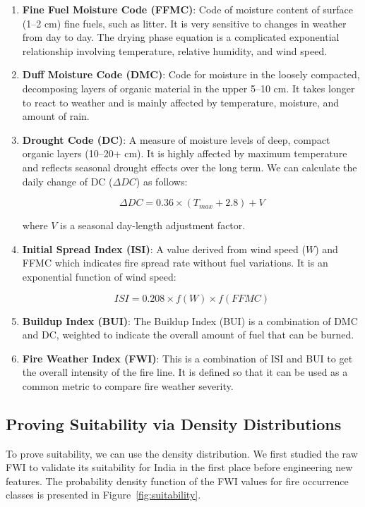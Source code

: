 \documentclass[journal, 10pt, twocolumn]{IEEEtran}
\begin{document}
\begin{enumerate}
    \item \textbf{Fine Fuel Moisture Code (FFMC)}: Code of moisture content of surface (1--2 cm) fine fuels, such as litter. It is very sensitive to changes in weather from day to day. The drying phase equation is a complicated exponential relationship involving temperature, relative humidity, and wind speed.

    \item \textbf{Duff Moisture Code (DMC)}: Code for moisture in the loosely compacted, decomposing layers of organic material in the upper 5--10 cm. It takes longer to react to weather and is mainly affected by temperature, moisture, and amount of rain.

    \item \textbf{Drought Code (DC)}: A measure of moisture levels of deep, compact organic layers (10--20+ cm). It is highly affected by maximum temperature and reflects seasonal drought effects over the long term. We can calculate the daily change of DC ($\Delta DC$) as follows:

    \begin{equation}
    \Delta DC = 0.36 \times (T_{max} + 2.8) + V
    \end{equation}

    where $V$ is a seasonal day-length adjustment factor.

    \item \textbf{Initial Spread Index (ISI)}: A value derived from wind speed ($W$) and FFMC which indicates fire spread rate without fuel variations. It is an exponential function of wind speed:

    \begin{equation}
    ISI = 0.208 \times f(W) \times f(FFMC)
    \end{equation}

    \item \textbf{Buildup Index (BUI)}: The Buildup Index (BUI) is a combination of DMC and DC, weighted to indicate the overall amount of fuel that can be burned.

    \item \textbf{Fire Weather Index (FWI)}: This is a combination of ISI and BUI to get the overall intensity of the fire line. It is defined so that it can be used as a common metric to compare fire weather severity.
\end{enumerate}

\subsection{Proving Suitability via Density Distributions}
To prove suitability, we can use the density distribution. We first studied the raw FWI to validate its suitability for India in the first place before engineering new features. The probability density function of the FWI values for fire occurrence classes is presented in Figure~\ref{fig:suitability}.
\end{document}
